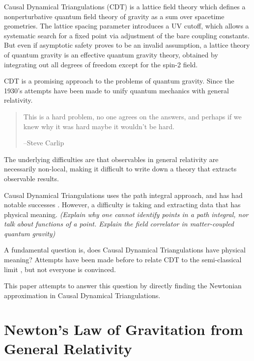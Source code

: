 \documentclass[12pt]{article}
\begin{document}
Causal Dynamical Triangulations (CDT) is a lattice field theory which defines a nonperturbative quantum field theory of gravity as a sum over spacetime geometries. The lattice spacing parameter introduces a UV cutoff, which allows a systematic search for a fixed point via adjustment of the bare coupling constants. But even if asymptotic safety proves to be an invalid assumption, a lattice theory of quantum gravity is an effective quantum gravity theory, obtained by integrating out all degrees of freedom except for the spin-2 field. 

CDT \cite{ambjorn_geometry_1996,cdt,ambjorn_nonperturbative_2012} is a promising approach to the problems of quantum gravity. Since the 1930's \cite{rovelli_notes_2000} attempts have been made to unify quantum mechanics with general relativity. 

\begin{quote}
This is a hard problem, no one agrees on the answers, and perhaps if we knew why it was hard maybe it wouldn't be hard.

--Steve Carlip
\end{quote}

The underlying difficulties are that observables in general relativity are necessarily non-local, making it difficult to write down a theory that extracts observable results.

Causal Dynamical Triangulations uses the path integral approach, and has had notable successes \cite{kommu_validation_2011}. However, a difficulty is taking and extracting data that has physical meaning. \textit{(Explain why one cannot identify points in a path integral, nor talk about functions of a point. Explain the field correlator in matter-coupled quantum gravity)}



A fundamental question is, does Causal Dynamical Triangulations have physical meaning? Attempts have been made before to relate CDT to the semi-classical limit \cite{ambjorn_semiclassical_2011,ambjorn_semiclassical}, but not everyone is convinced.

This paper attempts to answer this question by directly finding the Newtonian approximation in Causal Dynamical Triangulations.

\section{Newton's Law of Gravitation from General Relativity}
\label{sec:newtons-law}
\end{document}

